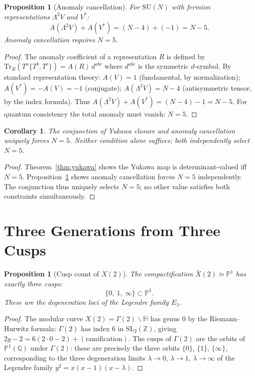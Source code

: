 \documentclass[12pt]{article}
\theoremstyle{plain}
\newtheorem{proposition}[theorem]{Proposition}
\newtheorem{corollary}[theorem]{Corollary}
\theoremstyle{definition}
\numberwithin{equation}{section}
\begin{document}
\begin{proposition}[Anomaly cancellation]\label{prop:anomaly}
For $\mathrm{SU}(N)$ with fermion representations $\Lambda^2 V$ and $V^*$:
\[
A(\Lambda^2 V)+A(V^*) = (N-4)+(-1) = N-5.
\]
Anomaly cancellation requires $N=5$.
\end{proposition}

\begin{proof}
The anomaly coefficient of a representation $R$ is defined by
$\mathrm{Tr}_R(T^a\{T^b,T^c\})=A(R)\,d^{abc}$ where $d^{abc}$ is the symmetric $d$-symbol.
By standard representation theory: $A(V)=1$ (fundamental, by normalization);
$A(V^*)=-A(V)=-1$ (conjugate); $A(\Lambda^2 V)=N-4$ (antisymmetric tensor, by the
index formula).  Thus $A(\Lambda^2 V)+A(V^*)=(N-4)-1=N-5$.
For quantum consistency the total anomaly must vanish: $N=5$.
\end{proof}

\begin{corollary}
The conjunction of Yukawa closure and anomaly cancellation uniquely forces
$N=5$.  Neither condition alone suffices; both independently select $N=5$.
\end{corollary}

\begin{proof}
Theorem~\ref{thm:yukawa} shows the Yukawa map is determinant-valued iff $N=5$.
Proposition~\ref{prop:anomaly} shows anomaly cancellation forces $N=5$ independently.
The conjunction thus uniquely selects $N=5$; no other value satisfies both constraints simultaneously.
\end{proof}

\section{Three Generations from Three Cusps}\label{sec:generations}

\begin{proposition}[Cusp count of $X(2)$]
The compactification $\bar{X}(2)\simeq\mathbb{P}^1$ has exactly three cusps:
\[
\{0,\ 1,\ \infty\}\subset\mathbb{P}^1.
\]
These are the degeneration loci of the Legendre family $E_\lambda$.
\end{proposition}

\begin{proof}
The modular curve $X(2)=\Gamma(2)\backslash\overline{\mathbb{H}}$ has genus 0 by the
Riemann--Hurwitz formula: $\Gamma(2)$ has index 6 in $\mathrm{SL}_2(\mathbb{Z})$,
giving $2g-2=6(2\cdot0-2)+(\text{ramification})$.  The cusps of $\Gamma(2)$ are the
orbits of $\mathbb{P}^1(\mathbb{Q})$ under $\Gamma(2)$: these are precisely the three
orbits $\{0\}$, $\{1\}$, $\{\infty\}$, corresponding to the three degeneration limits
$\lambda\to0$, $\lambda\to1$, $\lambda\to\infty$ of the Legendre family $y^2=x(x-1)(x-\lambda)$.
\end{proof}
\end{document}
